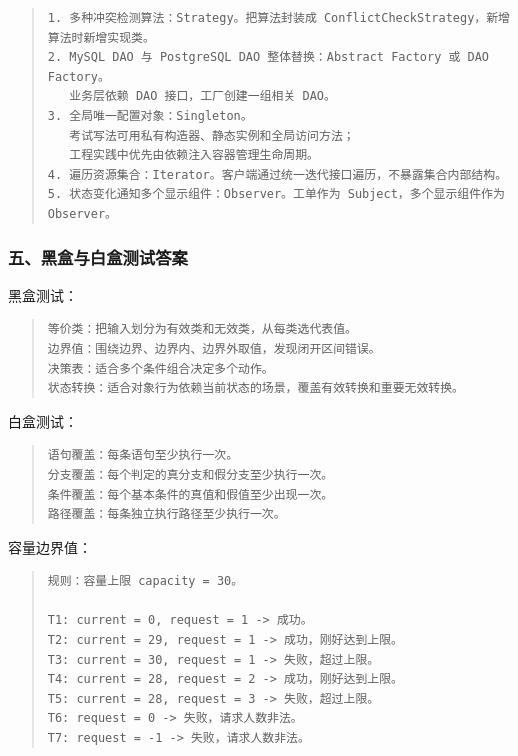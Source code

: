\documentclass[UTF8,zihao=-4]{ctexart}
\begin{document}
\begin{quote}
\footnotesize
\begin{verbatim}
1. 多种冲突检测算法：Strategy。把算法封装成 ConflictCheckStrategy，新增算法时新增实现类。
2. MySQL DAO 与 PostgreSQL DAO 整体替换：Abstract Factory 或 DAO Factory。
   业务层依赖 DAO 接口，工厂创建一组相关 DAO。
3. 全局唯一配置对象：Singleton。
   考试写法可用私有构造器、静态实例和全局访问方法；
   工程实践中优先由依赖注入容器管理生命周期。
4. 遍历资源集合：Iterator。客户端通过统一迭代接口遍历，不暴露集合内部结构。
5. 状态变化通知多个显示组件：Observer。工单作为 Subject，多个显示组件作为 Observer。
\end{verbatim}
\end{quote}


\subsubsection*{五、黑盒与白盒测试答案}


黑盒测试：


\begin{quote}
\footnotesize
\begin{verbatim}
等价类：把输入划分为有效类和无效类，从每类选代表值。
边界值：围绕边界、边界内、边界外取值，发现闭开区间错误。
决策表：适合多个条件组合决定多个动作。
状态转换：适合对象行为依赖当前状态的场景，覆盖有效转换和重要无效转换。
\end{verbatim}
\end{quote}


白盒测试：


\begin{quote}
\footnotesize
\begin{verbatim}
语句覆盖：每条语句至少执行一次。
分支覆盖：每个判定的真分支和假分支至少执行一次。
条件覆盖：每个基本条件的真值和假值至少出现一次。
路径覆盖：每条独立执行路径至少执行一次。
\end{verbatim}
\end{quote}


容量边界值：


\begin{quote}
\footnotesize
\begin{verbatim}
规则：容量上限 capacity = 30。

T1: current = 0, request = 1 -> 成功。
T2: current = 29, request = 1 -> 成功，刚好达到上限。
T3: current = 30, request = 1 -> 失败，超过上限。
T4: current = 28, request = 2 -> 成功，刚好达到上限。
T5: current = 28, request = 3 -> 失败，超过上限。
T6: request = 0 -> 失败，请求人数非法。
T7: request = -1 -> 失败，请求人数非法。
\end{verbatim}
\end{quote}
\end{document}
